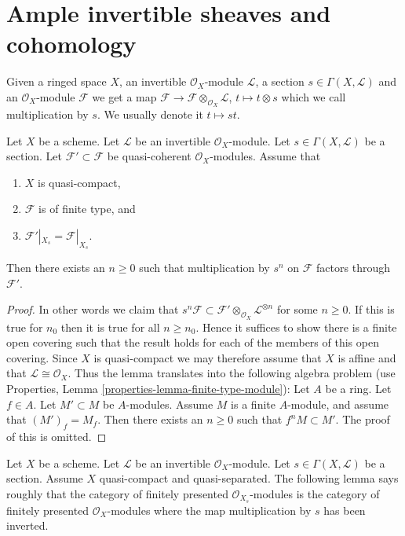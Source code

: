 \section{Ample invertible sheaves and cohomology}
\label{section-ample-cohomology}

\noindent
Given a ringed space $X$, an invertible $\mathcal{O}_X$-module $\mathcal{L}$,
a section $s \in \Gamma(X, \mathcal{L})$ and an $\mathcal{O}_X$-module
$\mathcal{F}$ we get a map
$\mathcal{F} \to \mathcal{F} \otimes_{\mathcal{O}_X} \mathcal{L}$,
$t \mapsto t \otimes s$ which we call multiplication by $s$.
We usually denote it $t \mapsto st$.

\begin{lemma}
\label{lemma-section-maps-back-into}
Let $X$ be a scheme.
Let $\mathcal{L}$ be an invertible $\mathcal{O}_X$-module.
Let $s \in \Gamma(X, \mathcal{L})$ be a section.
Let $\mathcal{F}' \subset \mathcal{F}$ be quasi-coherent
$\mathcal{O}_X$-modules. Assume that
\begin{enumerate}
\item $X$ is quasi-compact,
\item $\mathcal{F}$ is of finite type, and
\item $\mathcal{F}'|_{X_s} = \mathcal{F}|_{X_s}$.
\end{enumerate}
Then there exists an $n \geq 0$ such that
multiplication by $s^n$ on $\mathcal{F}$ factors
through $\mathcal{F}'$.
\end{lemma}

\begin{proof}
In other words we claim that
$s^n\mathcal{F} \subset
\mathcal{F}' \otimes_{\mathcal{O}_X} \mathcal{L}^{\otimes n}$
for some $n \geq 0$.
If this is true for $n_0$ then it is true for all $n \geq n_0$.
Hence it suffices to show there is a finite open covering such that
the result holds for each of the members of this open covering.
Since $X$ is quasi-compact we may therefore assume that $X$ is
affine and that $\mathcal{L} \cong \mathcal{O}_X$. Thus the lemma
translates into the following algebra problem (use Properties,
Lemma \ref{properties-lemma-finite-type-module}):
Let $A$ be a ring. Let $f \in A$. Let $M' \subset M$ be $A$-modules.
Assume $M$ is a finite $A$-module, and assume that
$(M')_f = M_f$. Then there exists an $n \geq 0$ such that
$f^n M \subset M'$. The proof of this is omitted.
\end{proof}

\medskip\noindent
Let $X$ be a scheme.
Let $\mathcal{L}$ be an invertible $\mathcal{O}_X$-module.
Let $s \in \Gamma(X, \mathcal{L})$ be a section.
Assume $X$ quasi-compact and quasi-separated.
The following lemma says roughly that the category of finitely
presented $\mathcal{O}_{X_s}$-modules is the category of
finitely presented $\mathcal{O}_X$-modules where the map
multiplication by $s$ has been inverted.

